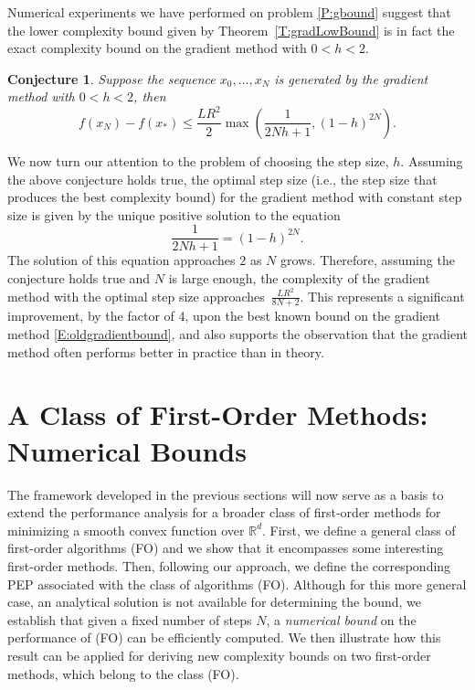 \documentclass[12pt]{article}
\numberwithin{equation}{section}
\newtheorem{conjecture}{Conjecture}[section]
\theoremstyle{definition}
\theoremstyle{remark}
\newcommand{\gradalg}{\text{GM}\xspace}
\begin{document}

Numerical experiments we have performed on problem \eqref{P:gbound} suggest that the
lower complexity bound given by Theorem~\ref{T:gradLowBound} is in fact the exact complexity bound on the gradient method
with $0<h<2$.%
\begin{conjecture}\label{C:gradtightbound}
Suppose the sequence $x_0,\dots,x_N$ is generated by the gradient method \gradalg with $0 <h < 2$,
then
\[
    f(x_N)-f(x_\ast)\leq \frac{L R^2}{2}
    \max \left( \frac{1}{2 N h+1},(1-h)^{2N}\right).
\]
\end{conjecture}
We now turn our attention to the problem of choosing the step size, $h$.
Assuming the above conjecture holds true,
the optimal step size (i.e., the step size that produces the best complexity bound)
for the gradient method with constant step size
is given by the unique positive solution to the equation $$\frac{1}{2 N
h+1}=(1-h)^{2N}.$$
The solution of this equation approaches $2$ as $N$ grows. Therefore, assuming the conjecture
holds true and $N$ is large enough, the complexity of the gradient method with the optimal
step size approaches~$\frac{LR^2}{8 N+2}$. This represents a significant improvement, by the
factor of 4, upon the best known bound on the gradient method \eqref{E:oldgradientbound}, and
also supports the observation that the gradient method often performs better in practice than
in theory.

\section{A Class of First-Order Methods: Numerical Bounds}\label{S:numerical_bounds}
The framework developed in the previous sections %
will now serve as a basis to extend the performance analysis for  a broader class of first-order methods
for minimizing a smooth convex function over $\mathbb{R}^d$. First, we define a general class
of first-order algorithms (FO) and we show that it encompasses some interesting first-order methods.
Then, following our approach, we define the corresponding PEP associated with the class of
algorithms (FO). Although for this more general case, an analytical solution is not available
for determining the bound, we establish that given a fixed number of steps $N$, a
{\em numerical bound} on the performance of (FO) can be efficiently computed. We then illustrate how this result can
be applied for deriving new complexity bounds on two first-order methods, which belong to the class (FO).
\end{document}
